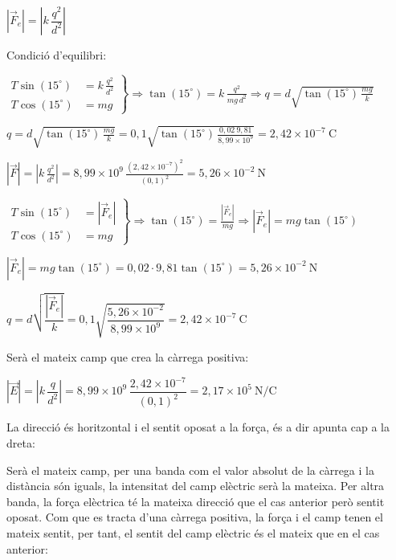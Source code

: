 \begin{solapartat}
 $\left|\vec{F}_e\right| = \left|k\,\dfrac{q^2}{d^2}\right|$

Condició d'equilibri:

 $\displaystyle \left.\begin{aligned} T\sin(15^\circ) &= k\,\frac{q^2}{d^2}\\ T\cos(15^\circ) &= mg \end{aligned}\right\} \Rightarrow \tan(15^\circ) = k\,\frac{q^2}{mg\,d^2} \Rightarrow q = d\sqrt{\tan(15^\circ)\,\frac{mg}{k}}$

 $\displaystyle q = d\sqrt{\tan(15^\circ)\,\frac{mg}{k}} = 0,1\sqrt{\tan(15^\circ)\,\frac{0,02\ 9,81}{8,99\times 10^{9}}} = 2,42\times 10^{-7}\ \mathrm{C}$

 $\displaystyle \left|\vec{F}\right| = \left|k\,\frac{q^2}{d^2}\right| = 8,99\times 10^{9}\,\frac{(2,42\times 10^{-7})^2}{(0,1)^2} = 5,26\times 10^{-2}\ \mathrm{N}$


 $\displaystyle \left.\begin{aligned} T\sin(15^\circ) &= \left|\vec{F}_e\right|\\ T\cos(15^\circ) &= mg \end{aligned}\right\} \Rightarrow \tan(15^\circ) = \frac{\left|\vec{F}_e\right|}{mg} \Rightarrow \left|\vec{F}_e\right| = mg\tan(15^\circ)$

 $\left|\vec{F}_e\right| = mg\tan(15^\circ) = 0,02\cdot 9,81\tan(15^\circ) = 5,26\times 10^{-2}\ \mathrm{N}$

 $q = d\sqrt{\dfrac{\left|\vec{F}_e\right|}{k}} = 0,1\sqrt{\dfrac{5,26\times 10^{-2}}{8,99\times 10^{9}}} = 2,42\times 10^{-7}\ \mathrm{C}$
\end{solapartat}

\begin{solapartat}
Serà el mateix camp que crea la càrrega positiva:

 $\left|\vec{E}\right| = \left|k\,\dfrac{q}{d^2}\right| = 8,99\times 10^{9}\,\dfrac{2,42\times 10^{-7}}{(0,1)^2} = 2,17\times 10^{5}\ \mathrm{N/C}$

 La direcció és horitzontal i el sentit oposat a la força, és a dir apunta cap a la dreta:

 Serà el mateix camp, per una banda com el valor absolut de la càrrega i la distància són iguals, la intensitat del camp elèctric serà la mateixa. Per altra banda, la força elèctrica té la mateixa direcció que el cas anterior però sentit oposat. Com que es tracta d'una càrrega positiva, la força i el camp tenen el mateix sentit, per tant, el sentit del camp elèctric és el mateix que en el cas anterior:
\end{solapartat}
